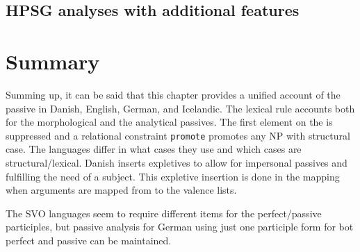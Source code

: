 \subsection{HPSG analyses with additional features}





\section{Summary}

Summing up, it can be said that this chapter provides a unified account of the passive in Danish,
English, German, and Icelandic. The lexical rule accounts both for the morphological and the
analytical passives. The first element on the \argstl is suppressed and a relational constraint
\texttt{promote} promotes any NP with structural case. The languages differ in what cases they use and
which cases are structural/lexical. Danish inserts expletives to allow for impersonal passives and
fulfilling the need of a subject. This expletive insertion is done in the \argst mapping when
arguments are mapped from \argst to the valence lists.

The SVO languages seem to require different items for the perfect/passive participles, but 
passive analysis for German using just one participle form for bot perfect and passive can be maintained.










